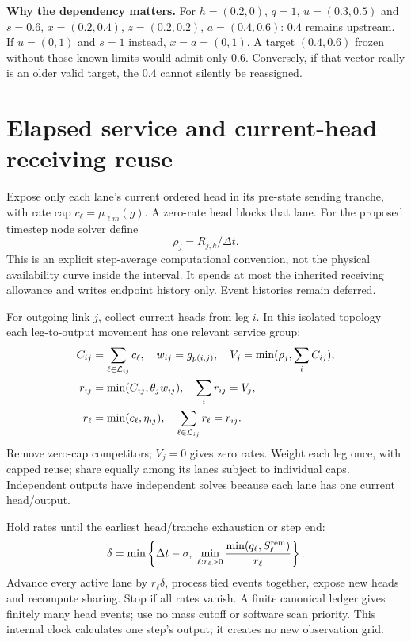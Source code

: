 \documentclass[10pt,a4paper]{article}
\begin{document}
\textbf{Why the dependency matters.}
For $h=(0.2,0)$, $q=1$, $u=(0.3,0.5)$ and $s=0.6$,
$x=(0.2,0.4)$, $z=(0.2,0.2)$, $a=(0.4,0.6)$:
$0.4$ remains upstream. If $u=(0,1)$ and $s=1$ instead,
$x=a=(0,1)$. A target $(0.4,0.6)$ frozen without those known limits would
admit only $0.6$. Conversely, if that vector really is an older valid target,
the $0.4$ cannot silently be reassigned.

\section{Elapsed service and current-head receiving reuse}

Expose only each lane's current ordered head in its pre-state sending
tranche, with rate cap $c_\ell=\mu_{\ell m}(g)$. A zero-rate head blocks that
lane. For the proposed timestep node solver define
\begin{equation}
 \rho_j=R_{j,k}/\Delta t.
 \label{eq:interval-rate}
\end{equation}
This is an explicit step-average computational convention, not the physical
availability curve inside the interval. It spends at most the inherited
receiving allowance and writes endpoint history only. Event histories remain
deferred.

For outgoing link $j$, collect current heads from leg $i$. In this isolated
topology each leg-to-output movement has one relevant service group:
\begin{align}
 C_{ij}&=\sum_{\ell\in{\cal L}_{ij}}c_\ell,\quad
 w_{ij}=g_{p(i,j)},\quad V_j=\min(\rho_j,\sum_iC_{ij}),\nonumber\\
 r_{ij}&=\min(C_{ij},\theta_jw_{ij}),\quad \sum_i r_{ij}=V_j,
 \label{eq:leg-rates-new}\\
 r_\ell&=\min(c_\ell,\eta_{ij}),\quad
 \sum_{\ell\in{\cal L}_{ij}}r_\ell=r_{ij}.
 \label{eq:lane-rates-new}
\end{align}
Remove zero-cap competitors; $V_j=0$ gives zero rates. Weight each leg once,
with capped reuse; share equally among its lanes subject to individual caps.
Independent outputs have independent solves because each lane has one
current head/output.

Hold rates until the earliest head/tranche exhaustion or step end:
\begin{equation}
 \delta=\min\left\{\Delta t-\sigma,\
 \min_{\ell:r_\ell>0}\frac{\min(q_\ell,S_\ell^{\rm rem})}{r_\ell}\right\}.
 \label{eq:head-step-new}
\end{equation}
Advance every active lane by $r_\ell\delta$, process tied events together,
expose new heads and recompute sharing. Stop if all rates vanish. A finite
canonical ledger gives finitely many head events; use no mass cutoff or
software scan priority. This internal clock calculates one step's output;
it creates no new observation grid.
\end{document}
